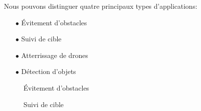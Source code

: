 Nous pouvons distinguer quatre principaux types d'applications:   
\begin{itemize}
\item[$\bullet$]Évitement d'obstacles 
\item[$\bullet$] Suivi de cible
\item[$\bullet$] Atterrissage de drones 
\item[$\bullet$] Détection d'objets 
\end{itemize}
\vspace{0.5cm}
\begin{figure}[H]
\centering
\begin{minipage}{0.49\textwidth}
	\hspace{0.6cm}
	\caption{Évitement d'obstacles}
	
\end{minipage}
\begin{minipage}{0.49\textwidth}
	\hspace{0.5cm}
	\caption{Suivi de cible}
\end{minipage}
\end{figure}
